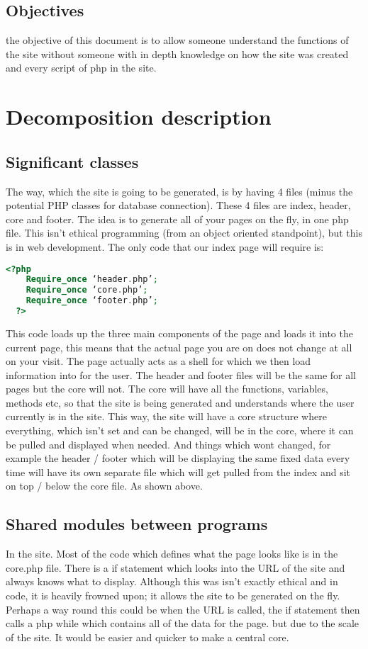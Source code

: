 \documentclass[12pt]{article}
\begin{document}
  \subsection{Objectives}
    the objective of this document is to allow someone understand the functions of the site without someone with in depth knowledge on how the site was created and every script of php in the site.


\section{Decomposition description}

  \subsection{Significant classes}
    The way, which the site is going to be generated, is by having 4 files (minus the potential PHP classes for database connection). These 4 files are index, header, core and footer.
The idea is to generate all of your pages on the fly, in one php file. This isn’t ethical programming (from an object oriented standpoint), but this is in web development. The only code that our index page will require is:

\begin{lstlisting}[language=php]
  <?php
    Require_once ‘header.php’;
    Require_once ‘core.php’;
    Require_once ‘footer.php’;
  ?>
  \end{lstlisting}

This code loads up the three main components of the page and loads it into the current page, this means that the actual page you are on does not change at all on your visit. The page actually acts as a shell for which we then load information into for the user. The header and footer files will be the same for all pages but the core will not. The core will have all the functions, variables, methods etc, so that the site is being generated and understands where the user currently is in the site.
This way, the site will have a core structure where everything, which isn’t set and can be changed, will be in the core, where it can be pulled and displayed when needed. And things which wont changed, for example the header / footer which will be displaying the same fixed data every time will have its own separate file which will get pulled from the index and sit on top / below the core file. As shown above.

  \subsection{Shared modules between programs}
    In the site. Most of the code which defines what the page looks like is in the core.php file. There is a if statement which looks into the URL of the site and always knows what to display. Although this was isn't exactly ethical and in code, it is heavily frowned upon; it allows the site to be generated on the fly. Perhaps a way round this could be when the URL is called, the if statement then calls a php while which contains all of the data for the page. but due to the scale of the site. It would be easier and quicker to make a central core.
\end{document}
